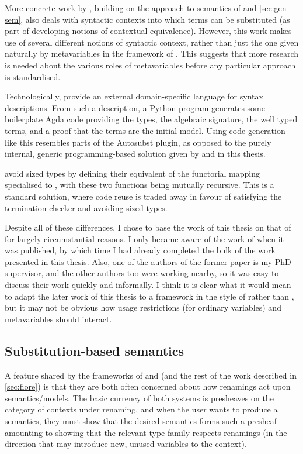 More concrete work by \citet{MMS18}, building on the approach to semantics of
\citet{ACMM17} and \cref{sec:gen-sem}, also deals with syntactic contexts into
which terms can be substituted (as part of developing notions of contextual
equivalence).
However, this work makes use of several different notions of syntactic context,
rather than just the one given naturally by metavariables in the framework of
\citeauthor{FS22}.
This suggests that more research is needed about the various roles of
metavariables before any particular approach is standardised.

Technologically, \citeauthor{FS22} provide an external domain-specific language
for syntax descriptions.
From such a description, a Python program generates some boilerplate Agda code
providing the types, the algebraic signature, the well typed terms, and a proof
that the terms are the initial model.
Using code generation like this resembles parts of the Autosubst plugin, as
opposed to the purely internal, generic programming-based solution given by
\citeauthor{AACMM21} and in this thesis.

 avoid sized types by defining their equivalent of the
functorial mapping  specialised to , with
these two functions being mutually recursive.
This is a standard solution, where code reuse is traded away in favour of
satisfying the termination checker and avoiding sized types.

Despite all of these differences,
I chose to base the work of this thesis on that of \citet{AACMM21} for largely
circumstantial reasons.
I only became aware of the work of \citet{FS22} when it was published, by which
time I had already completed the bulk of the work presented in this thesis.
Also, one of the authors of the former paper is my PhD supervisor, and the other
authors too were working nearby, so it was easy to discuss their work quickly
and informally.
I think it is clear what it would mean to adapt the later work of this thesis to
a framework in the style of \citeauthor{FS22} rather than \citeauthor{AACMM21},
but it may not be obvious how usage restrictions (for ordinary variables) and
metavariables should interact.

\subsection{Substitution-based semantics}

A feature shared by the frameworks of \citet{AACMM21} and \citet{FPT99} (and
the rest of the work described in \cref{sec:fiore}) is that they are both often
concerned about how renamings act upon semantics/models.
The basic currency of both systems is presheaves on the category of contexts
under renaming, and when the user wants to produce a semantics, they must show
that the desired semantics forms such a presheaf --- amounting to showing that
the relevant type family respects renamings (in the direction that may introduce
new, unused variables to the context).

